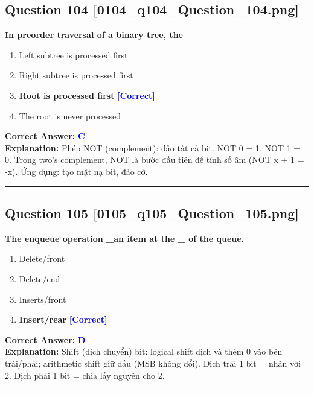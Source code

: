 \documentclass[11pt,a4paper]{article}
\begin{document}
\begin{minipage}{\textwidth}
\subsection*{Question 104 \quad \footnotesize{[0104\_q104\_Question\_104.png]}}
\noindent \textbf{In preorder traversal of a binary tree, the}

\begin{enumerate}[label=\Alph*.]
    \item Left subtree is processed first
    \item Right subtree is processed first
    \item \textbf{Root is processed first} \hfill \textcolor{blue}{\textbf{[Correct]}}
    \item The root is never processed
\end{enumerate}

\noindent \textbf{Correct Answer:} \textcolor{blue}{\textbf{C}} \\[2pt]
\noindent \textbf{Explanation:} Phép NOT (complement): đảo tất cả bit. NOT 0 = 1, NOT 1 = 0. Trong two's complement, NOT là bước đầu tiên để tính số âm (NOT x + 1 = -x). Ứng dụng: tạo mặt nạ bit, đảo cờ.

\par\vspace{0.3cm}
\hrule
\vspace{0.3cm}
\end{minipage}

\begin{minipage}{\textwidth}
\subsection*{Question 105 \quad \footnotesize{[0105\_q105\_Question\_105.png]}}
\noindent \textbf{The enqueue operation \_an item at the \_ of the queue.}

\begin{enumerate}[label=\Alph*.]
    \item Delete/front
    \item Delete/end
    \item Inserts/front
    \item \textbf{Insert/rear} \hfill \textcolor{blue}{\textbf{[Correct]}}
\end{enumerate}

\noindent \textbf{Correct Answer:} \textcolor{blue}{\textbf{D}} \\[2pt]
\noindent \textbf{Explanation:} Shift (dịch chuyển) bit: logical shift dịch và thêm 0 vào bên trái/phải; arithmetic shift giữ dấu (MSB không đổi). Dịch trái 1 bit = nhân với 2. Dịch phải 1 bit = chia lấy nguyên cho 2.

\par\vspace{0.3cm}
\hrule
\vspace{0.3cm}
\end{minipage}
\end{document}
